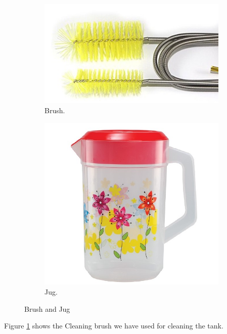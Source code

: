 \begin{figure}[h]
    \centering
    \begin{subfigure}[b]{0.3\textwidth}
        \includegraphics[width=\textwidth]{figures/brush.jpeg}
\caption{Brush.}
\label{Brush1}
    \end{subfigure}
     
        \begin{subfigure}[b]{0.3\textwidth}
\includegraphics[width=\textwidth]{figures/jug.jpeg}
\caption{Jug.}
\label{Jug1}
    \end{subfigure}
       \caption{Brush and Jug}
     \label{BrushANdJug}
    \end{figure}
Figure \ref{Brush1} shows the Cleaning brush we have used for cleaning the tank.
